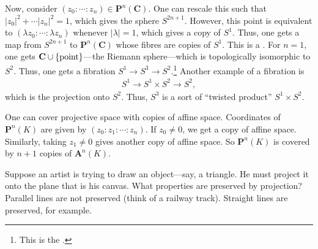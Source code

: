 \documentclass [11 pt, oneside] {article}
\begin{document}
Now, consider $(z_0:\cdots : z_n)\in \mathbf{P}^n(\mathbf{C})$. One can rescale this such that $\left\lvert z_0 \right\rvert ^2 + \cdots \left\lvert z_n \right\rvert ^2 = 1$, which gives the sphere $S^{2n+1}$. However, this point is equivalent to $(\lambda z_0:\cdots:\lambda z_n)$ whenever $\left\lvert \lambda \right\rvert =1$, which gives a copy of $S^1$. Thus, one gets a map from $S^{2n+1}$ to $\mathbf{P}^n(\mathbf{C})$ whose fibres are copies of $S^1$. This is a . For $n=1$, one gets $\mathbf C \cup \{ \textrm{point}\}$---the Riemann sphere---which is topologically isomorphic to $S^2$. Thus, one gets a fibration $S^1 \longrightarrow S^3 \longrightarrow S^2$.\footnote{This is the .} Another example of a fibration is 
\begin{align*}
	S^1 \longrightarrow S^1\times S^2 \longrightarrow S^2,
\end{align*}
which is the projection onto $S^2$. Thus, $S^3$ is a sort of ``twisted product'' $S^1\times S^2$.


One can cover projective space with copies of affine space. Coordinates of $\mathbf{P}^n(K)$ are given by $(z_0:z_1:\cdots : z_n)$. If $z_0\ne 0$, we get a copy of affine space. Similarly, taking $z_1\ne 0$ gives another copy of affine space. So $\mathbf{P}^n(K)$ is covered by $n+1$ copies of $\mathbf{A}^n(K)$.

Suppose an artist is trying to draw an object---say, a triangle. He must project it onto the plane that is his canvas. What properties are preserved by projection? Parallel lines are not preserved (think of a railway track). Straight lines are preserved, for example.
\end{document}
